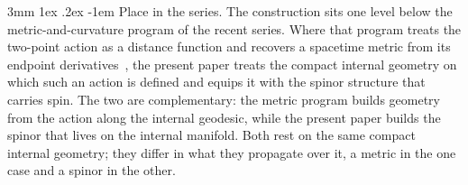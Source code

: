 \documentclass[%
 reprint, amsmath,amssymb, aps, prb, ]{revtex4-2}
\makeatletter
\numberwithin{equation}{section}
\renewcommand\paragraph{%
  \@startsection{paragraph}{4}{\z@}%
    {3mm \@plus 1ex \@minus .2ex}%
    {-1em}%
    {\normalfont\normalsize\itshape}}
\makeatother
\begin{document}
\paragraph{Place in the series.}
The construction sits one level below the metric-and-curvature program of the recent series. Where that program treats the two-point action as a distance function and recovers a spacetime metric from its endpoint derivatives~\cite{hanamura51,hanamura63}, the present paper treats the compact internal geometry on which such an action is defined and equips it with the spinor structure that carries spin. The two are complementary: the metric program builds geometry from the action along the internal geodesic, while the present paper builds the spinor that lives on the internal manifold. Both rest on the same compact internal geometry; they differ in what they propagate over it, a metric in the one case and a spinor in the other.
\end{document}
